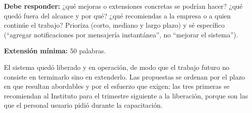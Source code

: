 \begin{guia}
\textbf{Debe responder:} ¿qué mejoras o extensiones concretas se podrían hacer? ¿qué quedó fuera del alcance y por qué?
¿qué recomiendas a la empresa o a quien continúe el trabajo? Prioriza (corto, mediano y largo plazo) y sé específico
(``agregar notificaciones por mensajería instantánea'', no ``mejorar el sistema'').

\textbf{Extensión mínima:} 50 palabras.
\end{guia}

El sistema quedó liberado y en operación, de modo que el trabajo futuro no consiste en terminarlo sino en extenderlo. Las propuestas se ordenan por el plazo en que resultan abordables y por el esfuerzo que exigen; las tres primeras se recomiendan al Instituto para el trimestre siguiente a la liberación, porque son las que el personal usuario pidió durante la capacitación.

